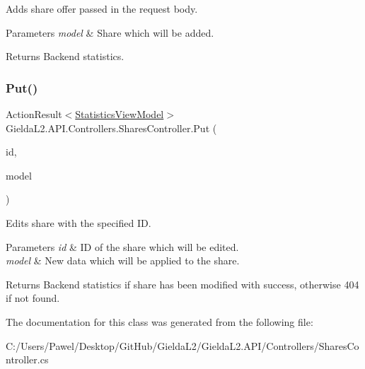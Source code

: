 Adds share offer passed in the request body. 


\begin{DoxyParams}{Parameters}
{\em model} & Share which will be added.\\
\hline
\end{DoxyParams}
\begin{DoxyReturn}{Returns}
Backend statistics.
\end{DoxyReturn}
\mbox{\label{class_gielda_l2_1_1_a_p_i_1_1_controllers_1_1_shares_controller_a348aaaccd93f56ec312cd4b3e7e3d7d0}} 
\subsubsection{\texorpdfstring{Put()}{Put()}}
{\footnotesize\ttfamily Action\+Result$<$\mbox{\hyperlink{class_gielda_l2_1_1_a_p_i_1_1_view_models_1_1_view_1_1_statistics_view_model}{Statistics\+View\+Model}}$>$ Gielda\+L2.\+A\+P\+I.\+Controllers.\+Shares\+Controller.\+Put (\begin{DoxyParamCaption}\item[{int}]{id,  }\item[{\mbox{[}\+From\+Body\mbox{]} \mbox{\hyperlink{class_gielda_l2_1_1_a_p_i_1_1_view_models_1_1_edit_1_1_edit_share_view_model}{Edit\+Share\+View\+Model}}}]{model }\end{DoxyParamCaption})}



Edits share with the specified ID. 


\begin{DoxyParams}{Parameters}
{\em id} & ID of the share which will be edited.\\
\hline
{\em model} & New data which will be applied to the share.\\
\hline
\end{DoxyParams}
\begin{DoxyReturn}{Returns}
Backend statistics if share has been modified with success, otherwise 404 if not found.
\end{DoxyReturn}


The documentation for this class was generated from the following file\+:\begin{DoxyCompactItemize}
\item 
C\+:/\+Users/\+Pawel/\+Desktop/\+Git\+Hub/\+Gielda\+L2/\+Gielda\+L2.\+A\+P\+I/\+Controllers/Shares\+Controller.\+cs\end{DoxyCompactItemize}
